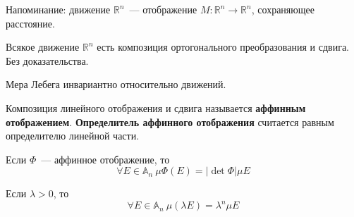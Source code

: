 \documentclass{article}
\begin{document}
    \begin{remark}
        Напоминание: движение $\mathbb R^n$~--- отображение $M\colon\mathbb R^n\to\mathbb R^n$, сохраняющее расстояние.
    \end{remark}
    \begin{remark}
        Всякое движение $\mathbb R^n$ есть композиция ортогонального преобразования и сдвига.\\
        Без доказательства.
    \end{remark}
    \begin{corollary}
        Мера Лебега инвариантно относительно движений.
    \end{corollary}
    \begin{definition}
        Композиция линейного отображения и сдвига называется \textbf{аффинным отображением}. \textbf{Определитель аффинного отображения} считается равным определителю линейной части.
    \end{definition}
    \begin{corollary}
        Если $\Phi$~--- аффинное отображение, то
        $$
        \forall E\in\mathbb A_n~\mu\Phi(E)=|\det\Phi|\mu E
        $$
    \end{corollary}
    \begin{corollary}
        Если $\lambda>0$, то
        $$
        \forall E\in\mathbb A_n~\mu(\lambda E)=\lambda^n\mu E
        $$
    \end{corollary}
\end{document}
